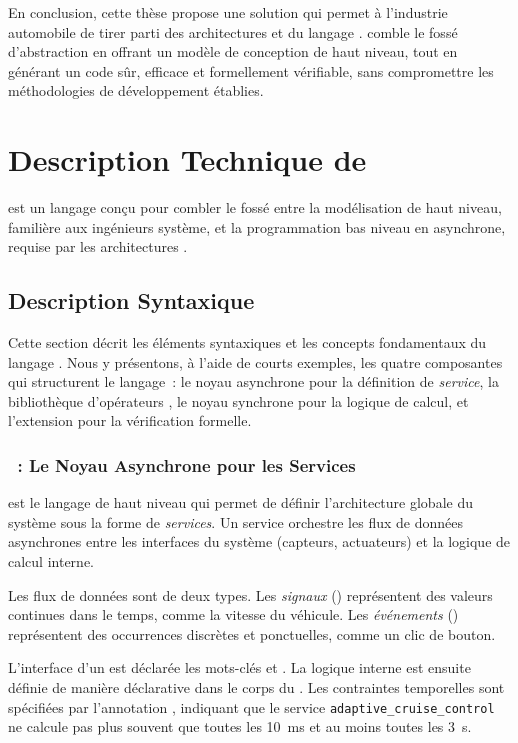 \medskip

En conclusion, cette thèse propose une solution qui permet à l'industrie automobile de tirer parti
des architectures \sdv et du langage \Rust. \GRust comble le fossé d'abstraction en offrant un
modèle de conception de haut niveau, tout en générant un code sûr, efficace et formellement
vérifiable, sans compromettre les méthodologies de développement établies.

\section{Description Technique de \GRust}

\GRust est un langage conçu pour combler le fossé entre la modélisation de haut niveau, familière
aux ingénieurs système, et la programmation bas niveau en \Rust asynchrone, requise par les
architectures \sdv.

\subsection{Description Syntaxique}

Cette section décrit les éléments syntaxiques et les concepts fondamentaux du langage \GRust. Nous y
présentons, à l'aide de courts exemples, les quatre composantes qui structurent le langage~: le
noyau asynchrone \GRFRP pour la définition de \emph{service}, la bibliothèque d'opérateurs \GReact,
le noyau synchrone \GRSync pour la logique de calcul, et l'extension \GReusot pour la vérification
formelle.

\subsubsection{\GRFRP~: Le Noyau Asynchrone pour les Services}

\GRFRP est le langage de haut niveau qui permet de définir l'architecture globale du système sous
la forme de \emph{services}. Un service orchestre les flux de données asynchrones entre les
interfaces du système (capteurs, actuateurs) et la logique de calcul interne.

Les flux de données sont de deux types. Les \emph{signaux} () représentent des
valeurs continues dans le temps, comme la vitesse du véhicule. Les \emph{événements}
() représentent des occurrences discrètes et ponctuelles, comme un clic de bouton.

L'interface d'un  est déclarée \via les mots-clés  et . La
logique interne est ensuite définie de manière déclarative dans le corps du .
Les contraintes temporelles sont spécifiées par l'annotation , indiquant
que le service \texttt{adaptive\_cruise\_control} ne calcule pas plus souvent que toutes les 10~ms
et au moins toutes les 3~s.

